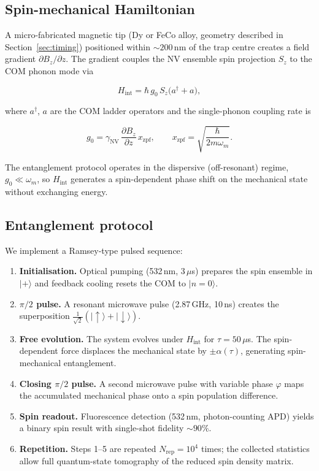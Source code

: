 \documentclass[12pt,a4paper]{article}
\begin{document}
\subsection{Spin-mechanical Hamiltonian}

A micro-fabricated magnetic tip (Dy or FeCo alloy, geometry described in
Section~\ref{sec:timing}) positioned within ${\sim}200$\,nm of the trap centre
creates a field gradient $\partial B_z/\partial z$. The gradient couples the NV
ensemble spin projection $S_z$ to the COM phonon mode via

\begin{equation}
H_{\mathrm{int}} = \hbar\, g_0\, S_z \bigl(a^\dagger + a\bigr),
\label{eq:hint}
\end{equation}

where $a^\dagger$, $a$ are the COM ladder operators and the single-phonon
coupling rate is

\begin{equation}
g_0 = \gamma_{\mathrm{NV}} \,\frac{\partial B_z}{\partial z}\, x_{\mathrm{zpf}},
\qquad
x_{\mathrm{zpf}} = \sqrt{\frac{\hbar}{2 m \omega_m}}.
\label{eq:g0}
\end{equation}

The entanglement protocol operates in the dispersive (off-resonant) regime,
$g_0 \ll \omega_m$, so $H_{\mathrm{int}}$ generates a spin-dependent phase shift
on the mechanical state without exchanging energy.

\subsection{Entanglement protocol}
\label{sec:protocol}

We implement a Ramsey-type pulsed sequence:

\begin{enumerate}
\item \textbf{Initialisation.} Optical pumping (532\,nm, 3\,$\mu$s) prepares
      the spin ensemble in $|+\rangle$ and feedback cooling resets the COM to
      $|n=0\rangle$.
\item \textbf{$\pi/2$ pulse.} A resonant microwave pulse (2.87\,GHz, 10\,ns)
      creates the superposition $\frac{1}{\sqrt{2}}(|\!\uparrow\rangle +
      |\!\downarrow\rangle)$.
\item \textbf{Free evolution.} The system evolves under $H_{\mathrm{int}}$ for
      $\tau = 50\,\mu$s. The spin-dependent force displaces the mechanical state
      by $\pm\alpha(\tau)$, generating spin-mechanical entanglement.
\item \textbf{Closing $\pi/2$ pulse.} A second microwave pulse with variable
      phase $\varphi$ maps the accumulated mechanical phase onto a spin
      population difference.
\item \textbf{Spin readout.} Fluorescence detection (532\,nm, photon-counting
      APD) yields a binary spin result with single-shot fidelity ${\sim}90\%$.
\item \textbf{Repetition.} Steps 1--5 are repeated $N_{\mathrm{rep}} = 10^4$
      times; the collected statistics allow full quantum-state tomography of the
      reduced spin density matrix.
\end{enumerate}
\end{document}
